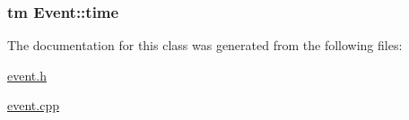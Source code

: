\hypertarget{classEvent_a91d5938dce4b4328e35f5626c22ec844}{
\subsubsection[{time}]{\setlength{\rightskip}{0pt plus 5cm}tm {\bf \-Event\-::time}}}\label{classEvent_a91d5938dce4b4328e35f5626c22ec844}


\-The documentation for this class was generated from the following files\-:\begin{DoxyCompactItemize}
\item 
\hyperlink{event_8h}{event.\-h}\item 
\hyperlink{event_8cpp}{event.\-cpp}\end{DoxyCompactItemize}
